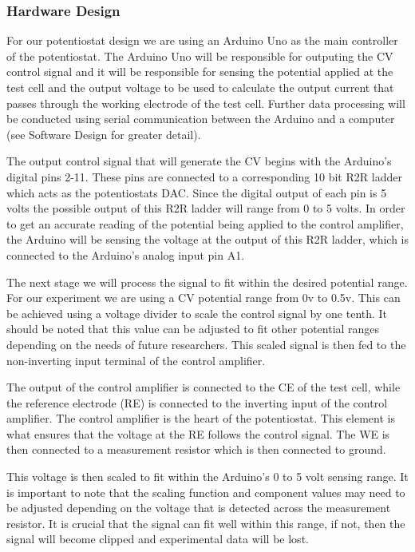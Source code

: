 \documentclass{article}
\begin{document}
\subsubsection*{Hardware Design}
For our potentiostat design we are using an Arduino Uno as the main controller of the potentiostat. The Arduino Uno will be responsible for outputing the CV control signal and it will be responsible for sensing the potential applied at the test cell and the output voltage to be used to calculate the output current that passes through the working electrode of the test cell. Further data processing will be conducted using serial communication between the Arduino and a computer (see Software Design for greater detail).

The output control signal that will generate the CV begins with the Arduino's digital pins 2-11. These pins are connected to a corresponding 10 bit R2R ladder which acts as the potentiostats DAC. Since the digital output of each pin is 5 volts the possible output of this R2R ladder will range from 0 to 5 volts. In order to get an accurate reading of the potential being applied to the control amplifier, the Arduino will be sensing the voltage at the output of this R2R ladder, which is connected to the Arduino's analog input pin A1.

The next stage we will process the signal to fit within the desired potential range. For our experiment we are using a CV potential range from 0v to 0.5v. This can be achieved using a voltage divider to scale the control signal by one tenth. It should be noted that this value can be adjusted to fit other potential ranges depending on the needs of future researchers. This scaled signal is then fed to the non-inverting input terminal of the control amplifier. 

The output of the control amplifier is connected to the CE of the test cell, while the reference electrode (RE) is connected to the inverting input of the control amplifier. The control amplifier is the heart of the potentiostat. This element is what ensures that the voltage at the RE follows the control signal. The WE is then connected to a measurement resistor which is then connected to ground. 

This voltage is then scaled to fit within the Arduino's 0 to 5 volt sensing range. It is important to note that the scaling function and component values may need to be adjusted depending on the voltage that is detected across the measurement resistor. It is crucial that the signal can fit well within this range, if not, then the signal will become clipped and experimental data will be lost.
\end{document}
